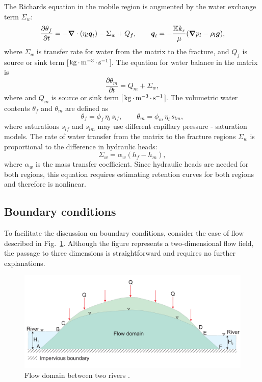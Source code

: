 The Richards equation in the mobile region is augmented by the water exchange
term $\Sigma_w$: 
\begin{equation}
  \frac{\partial \theta_f}{\partial t} 
  = -{\boldsymbol{\nabla}} \cdot (\eta_l {\boldsymbol{q}}_l) - \Sigma_w + Q_f,
  \qquad
  {\boldsymbol{q}}_l = -\frac{{\mathbb K} k_r}{\mu} ({\boldsymbol{\nabla}} p_l - \rho_l {\boldsymbol{g}}),
\end{equation}
where $\Sigma_w$ is transfer rate for water from the matrix to the fracture, 
and $Q_f$ is source or sink term [${\rm kg} {\,\cdot\,} {\rm m}^{-3} {\,\cdot\,} {\rm s}^{-1}$].
The equation for water balance in the matrix is
$$
  \frac{\partial \theta_m}{\partial t} 
  = Q_m + \Sigma_w,
$$
where and $Q_m$ is source or sink term [${\rm kg} {\,\cdot\,} {\rm m}^{-3} {\,\cdot\,} {\rm s}^{-1}$].
The volumetric water contents $\theta_f$ and $\theta_m$ are defined as
$$
  \theta_f = \phi_f\, \eta_l\, s_{lf},\qquad
  \theta_m = \phi_m\, \eta_l\, s_{lm},
$$
where saturations $s_{lf}$ and $s_{lm}$ may use different 
capillary pressure - saturation models.
The rate of water transfer from the matrix to the fracture regions $\Sigma_w$ 
is proportional to the difference in hydraulic heads:
$$
  \Sigma_w = \alpha_w (h_f - h_m),
$$
where $\alpha_w$ is the mass transfer coefficient.
Since hydraulic heads are needed for both regions, this equation requires
estimating retention curves for both regions and therefore is nonlinear.


\subsection{Boundary conditions}
\label{sec:flow-boundary-conditions}


To facilitate the discussion on boundary conditions, consider the case of 
flow described in Fig.~\ref{fig:bc_flow}. 
Although the figure represents a two-dimensional flow field, the passage to three dimensions 
is straightforward and requires no further explanations. 

\begin{figure}  [h]
\begin{center} 
\includegraphics[scale=0.25]{figs/bc_flow.pdf}
\caption{Flow domain between two rivers \citep[it was partially based on]{bear-1972}.}
\label{fig:bc_flow}
\end{center}
\end{figure}

